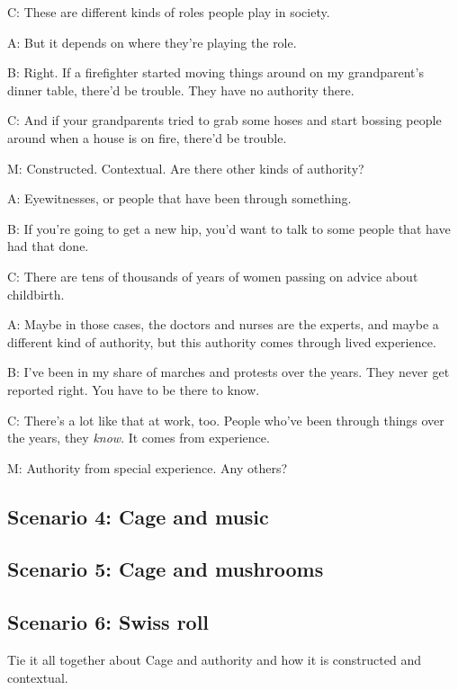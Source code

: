 \documentclass[17pt]{extarticle}
\begin{document}
C:  These are different kinds of roles people play in society.

A:  But it depends on where they're playing the role.

B:  Right.  If a firefighter started moving things around on my grandparent's dinner table, there'd be trouble.  They have no authority there.

C:  And if your grandparents tried to grab some hoses and start bossing people around when a house is on fire, there'd be trouble.

M:  Constructed.  Contextual.  Are there other kinds of authority?

A:  Eyewitnesses, or people that have been through something.

B:  If you're going to get a new hip, you'd want to talk to some people that have had that done.

C:  There are tens of thousands of years of women passing on advice about childbirth.

A:  Maybe in those cases, the doctors and nurses are the experts, and maybe a different kind of authority, but this authority comes through lived experience.

B:  I've been in my share of marches and protests over the years.  They never get reported right.  You have to be there to know.

C:  There's a lot like that at work, too.  People who've been through things over the years, they \textit{know}.  It comes from experience.

M:  Authority from special experience.  Any others?

\newpage

\subsection{Scenario 4: Cage and music}

\newpage

\subsection{Scenario 5: Cage and mushrooms}

\newpage

\subsection{Scenario 6: Swiss roll}

Tie it all together about Cage and authority and how it is constructed and contextual.
\end{document}

